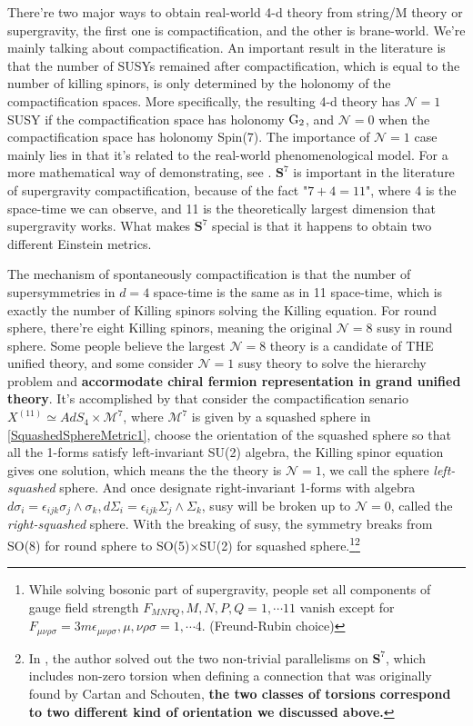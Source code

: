 \documentclass[12pt, a4paper]{article}
\numberwithin{equation}{section}
\newcommand{\cM}{\mathcal{M}}
\newcommand{\cN}{\mathcal{N}}
\begin{document}
	There're two major ways to obtain real-world 4-d theory from string/M theory or supergravity, the first one is compactification\cite{Grana:2005cr}, and the other is brane-world\cite{Maartens:2010wg}. We're mainly talking about compactification. An important result in the literature is that the number of SUSYs remained after compactification, which is equal to the number of killing spinors, is only determined by the holonomy of the compactification spaces. More specifically, the resulting 4-d theory has $\cN = 1$ SUSY if the compactification space has holonomy ${\rm G_2}$, and $\cN=0$ when the compactification space has holonomy Spin(7).\cite{Gubster:2002mt}\cite{Duff:2002ty} The importance of $\cN=1$ case mainly lies in that it's related to the real-world phenomenological model. For a more mathematical way of demonstrating, see \cite{Bryant:1989eh}. $\mathbf{S}^7$ is important in the literature of supergravity compactification, because of the fact "$7 + 4 = 11$", where 4 is the space-time we can observe, and 11 is the theoretically largest dimension that supergravity works. What makes $\mathbf{S}^7$ special is that it happens to obtain two different Einstein metrics.
	
	The mechanism of spontaneously compactification is that the number of supersymmetries in $d = 4$ space-time is the same as in 11 space-time, which is exactly the number of Killing spinors solving the Killing equation. For round sphere, there're eight Killing spinors, meaning the original $\cN = 8$ susy in round sphere. Some people believe the largest $\cN = 8$ theory is a candidate of THE unified theory, and some consider $\cN = 1$ susy theory to solve the hierarchy problem and \textbf{accormodate chiral fermion representation in grand unified theory}. It's accomplished by \cite{Awada:1983bd} that consider the compactification senario $X^{(11)} \simeq AdS_4 \times \cM^7$, where $\cM^7$ is given by a squashed sphere in \ref{SquashedSphereMetric1}, choose the orientation of the squashed sphere so that all the 1-forms satisfy left-invariant SU(2) algebra, the Killing spinor equation gives one solution, which means the the theory is $\cN = 1$, we call the sphere \textit{left-squashed} sphere. And once designate right-invariant 1-forms with algebra $d\sigma_i = \epsilon_{ijk}\sigma_j\wedge\sigma_k, d\Sigma_i = \epsilon_{ijk}\Sigma_j\wedge \Sigma_k$, susy will be broken up to $\cN = 0$, called the \textit{right-squashed} sphere. With the breaking of susy, the symmetry breaks from SO(8) for round sphere to SO(5)$\times$SU(2) for squashed sphere.\footnote{While solving bosonic part of supergravity, people set all components of gauge field strength $F_{MNPQ}, M,N,P,Q = 1,\cdots 11$ vanish except for $F_{\mu\nu\rho\sigma} = 3m\epsilon_{\mu\nu\rho\sigma}, \mu,\nu\rho\sigma = 1,\cdots 4$. (Freund-Rubin choice)}\footnote{In \cite{Englert:192ds}, the author solved out the two non-trivial parallelisms on $\mathbf{S}^7$, which includes non-zero torsion when defining a connection that was originally found by Cartan and Schouten, \textbf{the two classes of torsions correspond to two different kind of orientation we discussed above.}}\cite{Duff:1983ss}
	
\end{document}
